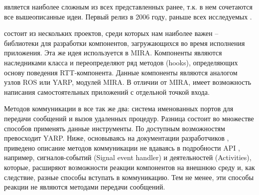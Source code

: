 \toolchain{} является наиболее сложным \marm{} из всех представленных ранее, т.к. в нем сочетаются все вышеописанные идеи. Первый релиз \toolchain{} в 2006 году, раньше всех исследуемых \marm{}. 

\toolchain{} состоит из нескольких проектов, среди которых нам наиболее важен \rtt{} -- библиотеки для разработки компонентов, загружающихся во время исполнения приложения. Эта же идея используется в MIRA. Компоненты \rtt{} являются наследниками класса  и переопределяют ряд методов (hooks), определяющих основу поведения RTT-компонента. Данные компоненты являются аналогом узлов ROS или YARP, модулей MIRA. В отличии от MIRA, \orocos{} имеет возможность написания самостоятельных приложений с отдельной точкой входа.

Методов коммуникации в \rtt{} все так же два: система именованных портов для передачи сообщений и вызов удаленных процедур. Разница состоит во множестве способов применять данные инструменты. По доступным возможностям \rtt{} превосходит YARP. Ниже, основываясь на документации разработчиков \cite{rtt-components}, приведено описание методов коммуникации не вдаваясь в подробности API \rtt{}, например, сигналов-событий (Signal event handler) и деятельностей (Activities), которые, расширяют возможности реакции компонентов на внешнюю среду и, как следствие, разные способы вступать в коммуникацию. Тем не менее, эти способы реакции не являются методами передачи сообщений.

